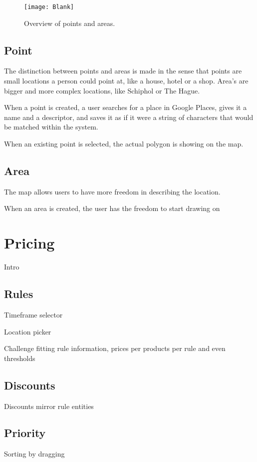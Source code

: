 \begin{figure}[H]
	\centering
	\texttt{[image: Blank]}
	\caption[Locations Overview]{Overview of points and areas.}
	\label{fig:Locations Overview}
\end{figure}

\subsection{Point}
The distinction between points and areas is made in the sense that points are small locations a person could point at, like a house, hotel or a shop. Area's are bigger and more complex locations, like Schiphol or The Hague.

When a point is created, a user searches for a place in Google Places, gives it a name and a descriptor, and saves it as if it were a string of characters that would be matched within the system.

When an existing point is selected, the actual polygon is showing on the map.

\subsection{Area}
The map allows users to have more freedom in describing the location.

When an area is created, the user has the freedom to start drawing on

%
\section{Pricing}
Intro

\subsection{Rules}
Timeframe selector

Location picker

Challenge fitting rule information, prices per products per rule and even thresholds

\subsection{Discounts}
Discounts mirror rule entities

\subsection{Priority}
Sorting by dragging

